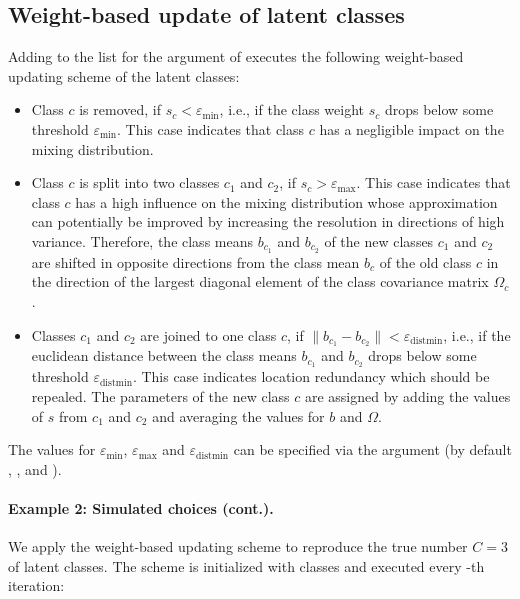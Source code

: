 \documentclass[article,shortnames]{jss}
\newcommand{\fct}[1]{\code{#1()}}
\begin{document}
\subsection{Weight-based update of latent classes} \label{subsec:weight_update}

Adding  to the list for the  argument of \fct{fit\_model} executes the following weight-based updating scheme of the latent classes:

\begin{itemize}
  \item Class $c$ is removed, if $s_c<\varepsilon_{\text{min}}$, i.e., if the class weight $s_c$ drops below some threshold $\varepsilon_{\text{min}}$. This case indicates that class $c$ has a negligible impact on the mixing distribution.
  \item Class $c$ is split into two classes $c_1$ and $c_2$, if $s_c>\varepsilon_\text{max}$. This case indicates that class $c$ has a high influence on the mixing distribution whose approximation can potentially be improved by increasing the resolution in directions of high variance. Therefore, the class means $b_{c_1}$ and $b_{c_2}$ of the new classes $c_1$ and $c_2$ are shifted in opposite directions from the class mean $b_c$ of the old class $c$ in the direction of the largest diagonal element of the class covariance matrix $\Omega_c$.
  \item Classes $c_1$ and $c_2$ are joined to one class $c$, if $\lVert b_{c_1} - b_{c_2} \rVert<\varepsilon_{\text{distmin}}$, i.e., if the euclidean distance between the class means $b_{c_1}$ and $b_{c_2}$  drops below some threshold $\varepsilon_{\text{distmin}}$. This case indicates location redundancy which should be repealed. The parameters of the new class $c$ are assigned by adding the values of $s$ from $c_1$ and $c_2$ and averaging the values for $b$ and $\Omega$.
\end{itemize}

The values for $\varepsilon_{\text{min}}$, $\varepsilon_{\text{max}}$ and $\varepsilon_{\text{distmin}}$ can be specified via the  argument (by default , , and ).

\paragraph{Example 2: Simulated choices (cont.).}

We apply the weight-based updating scheme to reproduce the true number $C = 3$ of latent classes. The scheme is initialized with  classes and executed every -th iteration:
\end{document}
